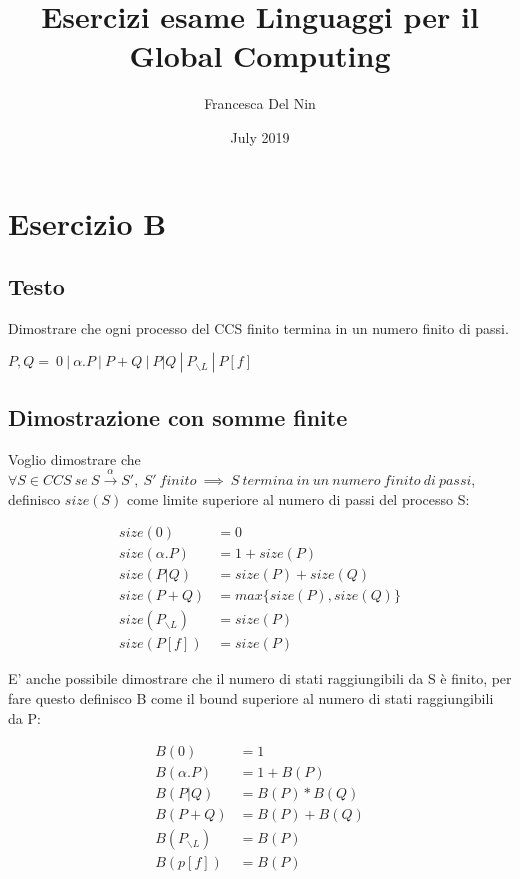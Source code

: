 \documentclass{article}
\title{Esercizi esame Linguaggi per il Global Computing}
\author{Francesca Del Nin}
\date{July 2019}
\newcommand{\pl}{P_{\backslash L}}
\begin{document}
\maketitle

\section{Esercizio B}
\subsection{Testo}

Dimostrare che ogni processo del CCS finito termina in un numero finito di passi.
\begin{center}
    $P, Q = ~0 ~|~ \alpha .P~|~ P+Q~|~ P|Q ~ | ~P_{\backslash L}~|~P[f] $
\end{center}

\subsection{Dimostrazione con somme finite}
Voglio dimostrare che  $\forall S \in CCS~  se ~ S \xrightarrow{\alpha}  S', ~S'~  finito ~ \implies  ~ S ~ termina~  in~  un~  numero~  finito ~ di~  passi$, definisco $size(S)$ come limite superiore al numero di passi del processo S:

\begin{align*}
size(0) &= 0 \\
size(\alpha.P) &= 1+size(P)\\
size(P|Q) &= size(P)+size(Q)\\
size(P+Q) &= max\{size(P), size(Q)\}\\
size(P_{\backslash L}) &= size(P)\\
size(P[f]) &= size(P)
\end{align*}

E' anche possibile dimostrare che il numero di stati raggiungibili da S è finito, per fare questo definisco B come il bound superiore al numero di stati raggiungibili da P:

\begin{align*}
B(0) &= 1\\
B(\alpha.P) &= 1 + B(P)\\
B(P|Q) &= B(P) * B(Q)\\
B(P+Q) &= B(P) + B(Q)\\
B(\pl) &=  B(P)\\
B(p[f]) &=  B(P)
\end{align*}
\end{document}
